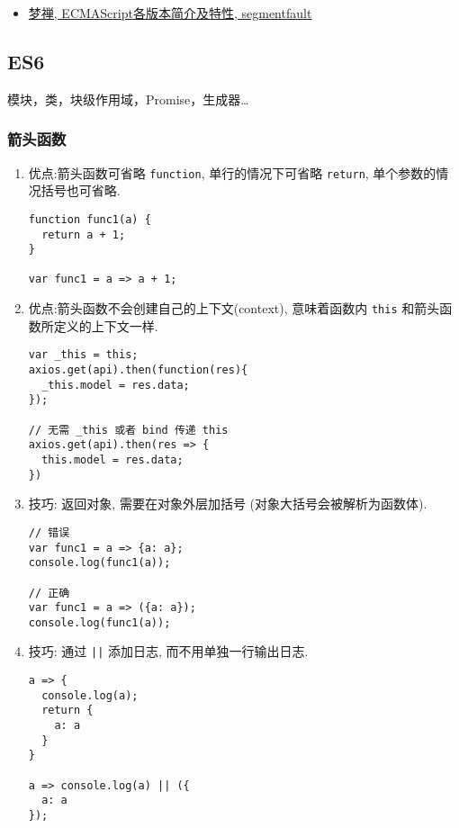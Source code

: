 \begin{itemize}
\tightlist
\item
  \href{http://segmentfault.com/a/1190000003493604}{梦禅,
  ECMAScript各版本简介及特性, segmentfault}
\end{itemize}

\subsection{ES6}\label{es6}

模块，类，块级作用域，Promise，生成器\ldots{}

\subsubsection{箭头函数}\label{ux7badux5934ux51fdux6570}

\begin{enumerate}
\def\labelenumi{\arabic{enumi}.}
\item
  优点:箭头函数可省略 \lstinline!function!, 单行的情况下可省略
  \lstinline!return!, 单个参数的情况括号也可省略.

\begin{lstlisting}
function func1(a) {
  return a + 1;
}

var func1 = a => a + 1;
\end{lstlisting}
\item
  优点:箭头函数不会创建自己的上下文(context), 意味着函数内
  \lstinline!this! 和箭头函数所定义的上下文一样.

\begin{lstlisting}
var _this = this;
axios.get(api).then(function(res){
  _this.model = res.data;
});

// 无需 _this 或者 bind 传递 this
axios.get(api).then(res => {
  this.model = res.data;
})
\end{lstlisting}
\item
  技巧: 返回对象, 需要在对象外层加括号 (对象大括号会被解析为函数体).

\begin{lstlisting}
// 错误
var func1 = a => {a: a};
console.log(func1(a));

// 正确
var func1 = a => ({a: a});
console.log(func1(a));
\end{lstlisting}
\item
  技巧: 通过 \lstinline!||! 添加日志, 而不用单独一行输出日志.

\begin{lstlisting}
a => {
  console.log(a);
  return {
    a: a
  }
}

a => console.log(a) || ({
  a: a
});
\end{lstlisting}
\end{enumerate}

